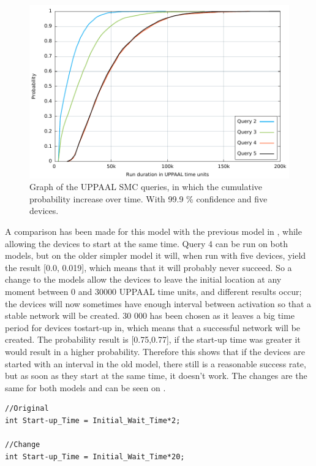 \begin{figure}[ht]
  \includegraphics[width=1\textwidth]{Figures/Graphs/gnuplot/uppaal/graph.pdf} 
\caption{Graph of the UPPAAL SMC queries, in which the cumulative probability increase over time. With 99.9 \% confidence and five devices.}
\label{fig:ConnectQueryTime}
\end{figure}

\bigskip
\noindent
A comparison has been made for this model with the previous model in , while allowing the devices to start at the same time.
Query 4 can be run on both models, but on the older simpler model it will, when run with five devices, yield the result [0.0, 0.019], which means that it will probably never succeed.
So a change to the models allow the devices to leave the initial location at any moment between 0 and 30000 UPPAAL time units, and different results occur; the devices will now sometimes have enough interval between activation so that a stable network will be created. 
30 000 has been chosen as it leaves a big time period for devices tostart-up in, which means that a successful network will be created.
The probability result is [0.75,0.77], if the start-up time was greater it would result in a higher probability.
Therefore this shows that if the devices are started with an interval in the old model, there still is a reasonable success rate, but as soon as they start at the same time, it doesn't work. 
The changes are the same for both models and can be seen on . 

\begin{lstlisting}[style=UPPAAL, caption={Change in thestart-up time for devices.}, label={lst:startuptimeChanceListing}, float=h]
//Original
int Start-up_Time = Initial_Wait_Time*2;

//Change
int Start-up_Time = Initial_Wait_Time*20;
\end{lstlisting}

